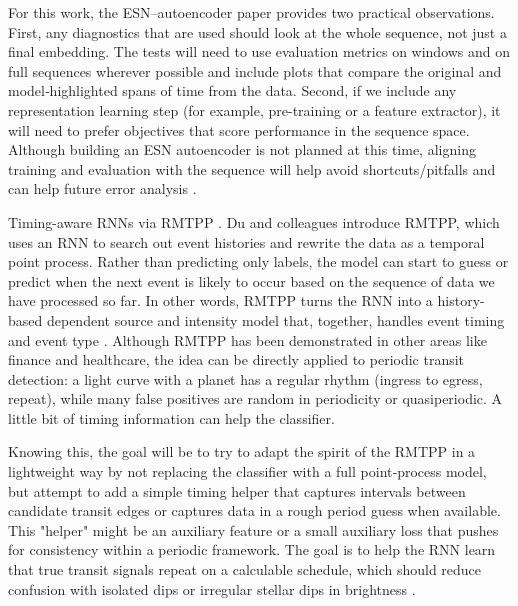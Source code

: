 \documentclass[letterpaper]{article} %
\begin{document}
For this work, the ESN–autoencoder paper provides two practical observations. First, any diagnostics that are used should look at the whole sequence, not just a final embedding. The tests will need to use evaluation metrics on windows and on full sequences wherever possible and include plots that compare the original and model‑highlighted spans of time from the data. Second, if we include any representation learning step (for example, pre-training or a feature extractor), it will need to prefer objectives that score performance in the sequence space. Although building an ESN autoencoder is not planned at this time, aligning training and evaluation with the sequence will help avoid shortcuts/pitfalls and can help future error analysis \cite{kugler2016explorativeapproachkepler}.

Timing-aware RNNs via RMTPP \cite{Du2016markedtemporalpoint}. Du and colleagues introduce RMTPP, which uses an RNN to search out event histories and rewrite the data as a temporal point process. Rather than predicting only labels, the model can start to guess or predict when the next event is likely to occur based on the sequence of data we have processed so far. In other words, RMTPP turns the RNN into a history-based dependent source and intensity model that, together, handles event timing and event type \cite{Du2016markedtemporalpoint}. Although RMTPP has been demonstrated in other areas like finance and healthcare, the idea can be directly applied to periodic transit detection: a light curve with a planet has a regular rhythm (ingress to egress, repeat), while many false positives are random in periodicity or quasiperiodic. A little bit of timing information can help the classifier.

Knowing this, the goal will be to try to adapt the spirit of the RMTPP in a lightweight way by not replacing the classifier with a full point‑process model, but attempt to add a simple timing helper that captures intervals between candidate transit edges or captures data in a rough period guess when available. This "helper" might be an auxiliary feature or a small auxiliary loss that pushes for consistency within a periodic framework. The goal is to help the RNN learn that true transit signals repeat on a calculable schedule, which should reduce confusion with isolated dips or irregular stellar dips in brightness \cite{Du2016markedtemporalpoint}.
\end{document}
